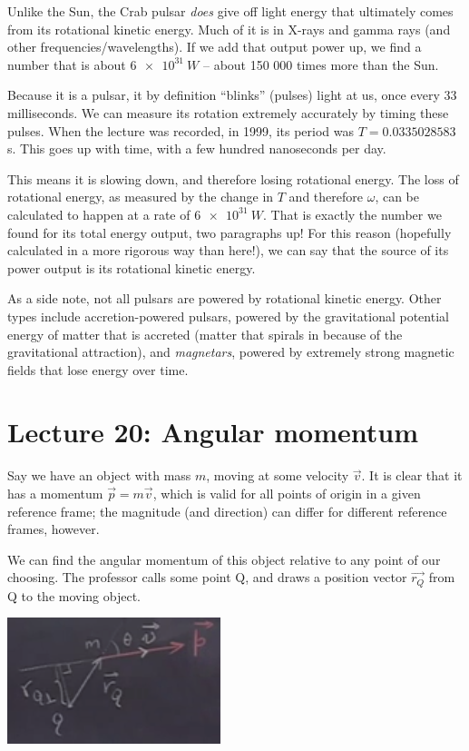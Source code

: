 \documentclass[12pt,a4paper]{report}
\begin{document}
Unlike the Sun, the Crab pulsar \emph{does} give off light energy that ultimately comes from its rotational kinetic energy. Much of it is in X-rays and gamma rays (and other frequencies/wavelengths). If we add that output power up, we find a number that is about $\SI{6e31}{W}$ -- about 150 000 times more than the Sun.

Because it is a pulsar, it by definition ``blinks'' (pulses) light at us, once every 33 milliseconds. We can measure its rotation extremely accurately by timing these pulses. When the lecture was recorded, in 1999, its period was $T = 0.0335028583$ s. This goes up with time, with a few hundred nanoseconds per day.

This means it is slowing down, and therefore losing rotational energy. The loss of rotational energy, as measured by the change in $T$ and therefore $\omega$, can be calculated to happen at a rate of $\SI{6e31}{W}$. That is exactly the number we found for its total energy output, two paragraphs up! For this reason (hopefully calculated in a more rigorous way than here!), we can say that the source of its power output is its rotational kinetic energy.

As a side note, not all pulsars are powered by rotational kinetic energy. Other types include accretion-powered pulsars, powered by the gravitational potential energy of matter that is accreted (matter that spirals in because of the gravitational attraction), and \emph{magnetars}, powered by extremely strong magnetic fields that lose energy over time.

\section{Lecture 20: Angular momentum}

Say we have an object with mass $m$, moving at some velocity $\vec{v}$. It is clear that it has a momentum $\vec{p} = m \vec{v}$, which is valid for all points of origin in a given reference frame; the magnitude (and direction) can differ for different reference frames, however.

We can find the angular momentum of this object relative to any point of our choosing. The professor calls some point Q, and draws a position vector $\vec{r_Q}$ from Q to the moving object.

\begin{center}
\includegraphics[scale=0.7]{Graphics/lec20_angular_momentum}
\end{center}
\end{document}
